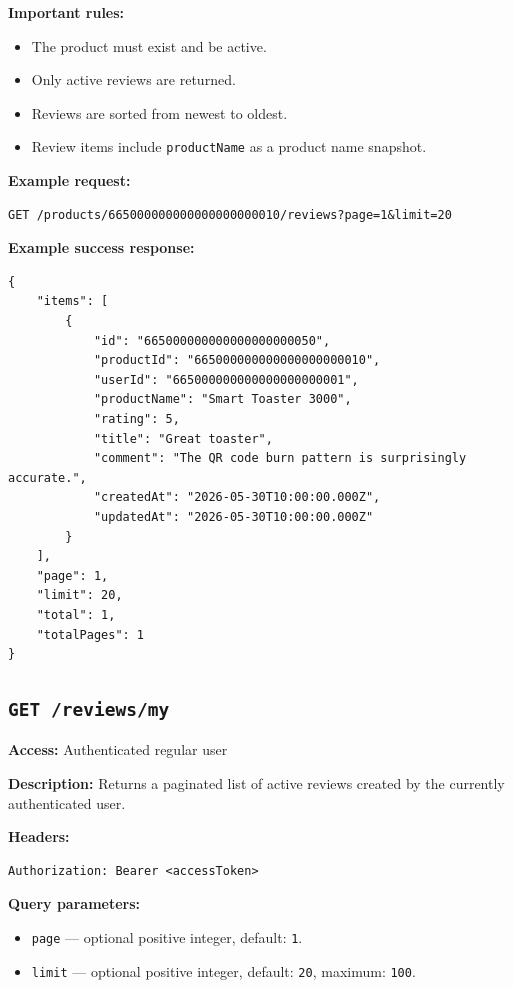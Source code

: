 \textbf{Important rules:}

\begin{itemize}
    \item The product must exist and be active.
    \item Only active reviews are returned.
    \item Reviews are sorted from newest to oldest.
    \item Review items include \texttt{productName} as a product name snapshot.
\end{itemize}

\textbf{Example request:}

\begin{verbatim}
GET /products/665000000000000000000010/reviews?page=1&limit=20
\end{verbatim}

\pagebreak
\textbf{Example success response:}

\begin{verbatim}
{
    "items": [
        {
            "id": "665000000000000000000050",
            "productId": "665000000000000000000010",
            "userId": "665000000000000000000001",
            "productName": "Smart Toaster 3000",
            "rating": 5,
            "title": "Great toaster",
            "comment": "The QR code burn pattern is surprisingly accurate.",
            "createdAt": "2026-05-30T10:00:00.000Z",
            "updatedAt": "2026-05-30T10:00:00.000Z"
        }
    ],
    "page": 1,
    "limit": 20,
    "total": 1,
    "totalPages": 1
}
\end{verbatim}

\subsection{\texttt{GET /reviews/my}}

\textbf{Access:} Authenticated regular user

\textbf{Description:} Returns a paginated list of active reviews created by the currently authenticated user.

\textbf{Headers:}

\begin{verbatim}
Authorization: Bearer <accessToken>
\end{verbatim}

\textbf{Query parameters:}

\begin{itemize}
    \item \texttt{page} --- optional positive integer, default: \texttt{1}.
    \item \texttt{limit} --- optional positive integer, default: \texttt{20}, maximum: \texttt{100}.
\end{itemize}


